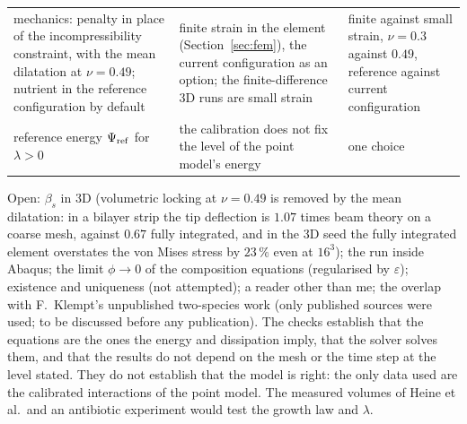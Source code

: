 \documentclass[11pt,a4paper]{article}
\begin{document}
\begin{center}
\begin{tabularx}{\linewidth}{@{}YYp{2.3cm}@{}}
mechanics: penalty in place of the incompressibility constraint, with the mean dilatation at
$\nu=0.49$; nutrient in the reference configuration by default & finite strain in the element
(Section~\ref{sec:fem}), the current configuration as an option; the finite-difference 3D runs
are small strain & finite against small strain, $\nu=0.3$ against $0.49$, reference against
current configuration\\
reference energy $\Psi_{\rm ref}$ for $\lambda>0$ & the calibration does not fix the level of the
point model's energy & one choice\\
\bottomrule
\end{tabularx}
\end{center}

\noindent Open: $\beta_s$ in 3D (volumetric locking at $\nu=0.49$ is removed by the mean
dilatation: in a bilayer strip the tip deflection is $1.07$ times beam theory on a coarse mesh,
against $0.67$ fully integrated, and in the 3D seed the fully integrated element overstates the
von Mises stress by $23\,\%$ even at $16^3$); the run inside
Abaqus; the limit $\phi\to0$ of the composition equations (regularised by
$\varepsilon$); existence and uniqueness (not attempted); a reader other than me; the overlap
with F.\ Klempt's unpublished two-species work (only published sources were used; to be
discussed before any publication). The checks establish that the equations are the ones the
energy and dissipation imply, that the solver solves them, and that the results do not depend
on the mesh or the time step at the level stated. They do not establish that the model is
right: the only data used are the calibrated interactions of the point model. The measured
volumes of Heine et al.\ and an antibiotic experiment would test the growth law and $\lambda$.
\end{document}
